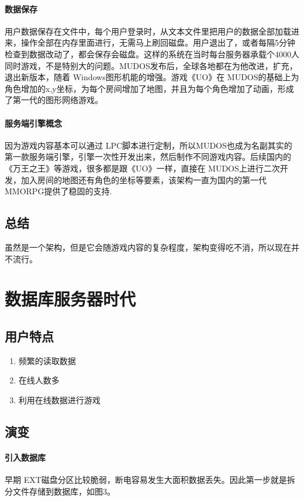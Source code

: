 \documentclass[UTF8,a4paper,8pt]{ctexart}
\begin{document}
			\paragraph{数据保存}用户数据保存在文件中，每个用户登录时，从文本文件里把用户的数据全部加载进来，操作全部在内存里面进行，无需马上刷回磁盘。用户退出了，或者每隔5分钟检查到数据改动了，都会保存会磁盘。这样的系统在当时每台服务器承载个4000人同时游戏，不是特别大的问题。MUDOS发布后，全球各地都在为他改进，扩充，退出新版本，随着 Windows图形机能的增强。游戏《UO》在 MUDOS的基础上为角色增加的x,y坐标，为每个房间增加了地图，并且为每个角色增加了动画，形成了第一代的图形网络游戏。
			
			\paragraph{服务端引擎概念}因为游戏内容基本可以通过 LPC脚本进行定制，所以MUDOS也成为名副其实的第一款服务端引擎，引擎一次性开发出来，然后制作不同游戏内容。后续国内的《万王之王》等游戏，很多都是跟《UO》一样，直接在 MUDOS上进行二次开发，加入房间的地图还有角色的坐标等要素，该架构一直为国内的第一代 MMORPG提供了稳固的支持.
			
	\subsection{总结}虽然是一个架构，但是它会随游戏内容的复杂程度，架构变得吃不消，所以现在并不流行。
\newpage	
\section{数据库服务器时代}
		\subsection{用户特点}
			\begin{enumerate}[fullwidth,itemindent = 2em]
				\item  频繁的读取数据
				\item  在线人数多
				\item  利用在线数据进行游戏
			\end{enumerate}
	    \subsection{演变}	
			\paragraph{引入数据库}早期 EXT磁盘分区比较脆弱，断电容易发生大面积数据丢失。因此第一步就是拆分文件存储到数据库，如图3。
			
\end{document}
